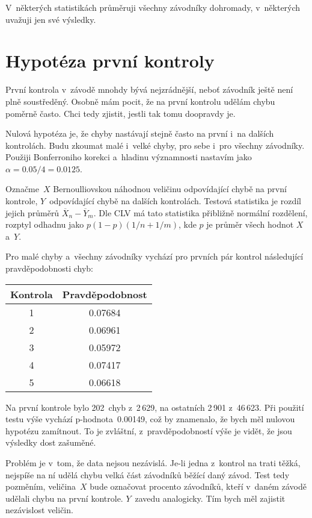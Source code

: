 \documentclass[a4paper,11pt]{article}
\begin{document}
V~některých statistikách průměruji všechny závodníky dohromady, v~některých
uvažuji jen své výsledky.
\pagebreak

\section*{Hypotéza první kontroly}

První kontrola v~závodě mnohdy bývá nejzrádnější, neboť závodník ještě není plně
soustředěný. Osobně mám pocit, že na první kontrolu udělám chybu poměrně často.
Chci tedy zjistit, jestli tak tomu doopravdy je.

Nulová hypotéza je, že chyby nastávají stejně často na první i~na dalších
kontrolách. Budu zkoumat malé i~velké chyby, pro sebe i~pro všechny závodníky.
Použiji Bonferroniho korekci a~hladinu významnosti nastavím jako
$\alpha = 0.05 / 4 = 0.0125$.

Označme~$X$ Bernoulliovskou náhodnou veličinu odpovídající chybě na první
kontrole, $Y$~odpovídající chybě na dalších kontrolách. Testová statistika je
rozdíl jejich průměrů $\overline{X}_n - \overline{Y}_m$. Dle CLV má tato
statistika přibližně normální rozdělení, rozptyl odhadnu jako
$p (1-p) (1/n + 1/m)$, kde $p$ je průměr všech hodnot $X$ a~$Y$.

Pro malé chyby a~všechny závodníky vychází pro prvních pár kontrol následující
pravděpodobnosti chyb:

\begin{tabular}{c | c}
    Kontrola & Pravděpodobnost \\
    \hline
    1        & 0.07684         \\
    2        & 0.06961         \\
    3        & 0.05972         \\
    4        & 0.07417         \\
    5        & 0.06618         \\
\end{tabular}

Na první kontrole bylo 202~chyb z~2\,629, na ostatních 2\,901 z~46\,623. Při
použití testu výše vychází p-hodnota~0.00149, což by znamenalo, že bych měl
nulovou hypotézu zamítnout. To je zvláštní, z~pravděpodobností výše je vidět, že
jsou výsledky dost zašuměné.

Problém je v~tom, že data nejsou nezávislá. Je-li jedna z~kontrol na trati
těžká, nejspíše na ní udělá chybu velká část závodníků běžící daný závod. Test
tedy pozměním, veličina~$X$ bude označovat procento závodníků, kteří v~daném
závodě udělali chybu na první kontrole. $Y$~zavedu analogicky. Tím bych měl
zajistit nezávislost veličin.
\end{document}
